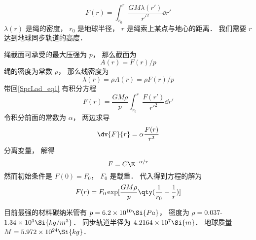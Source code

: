 
\begin{equation}\label{SpcLad_eq1}
F(r) = \int_{r_0}^{r} \frac{GM\lambda(r')}{r'^2} \dd{r'}
\end{equation}
$\lambda(r)$ 是绳的密度， $r_0$ 是地球半径， $r$ 是绳索上某点与地心的距离． 我们需要 $r$ 达到地球同步轨道的高度．

绳截面可承受的最大压强为 $p$， 那么截面为
\begin{equation}
A(r) = F(r)/p
\end{equation}
绳的密度为常数 $\rho$， 那么线密度为
\begin{equation}
\lambda(r) = \rho A(r) = \rho F(r)/p
\end{equation}
带回\autoref{SpcLad_eq1} 有积分方程
\begin{equation}
F(r) = \frac{GM\rho}{p} \int_{r_0}^{r} \frac{F(r')}{r'^2} \dd{r'}
\end{equation}
令积分前面的常数为 $\alpha$， 两边求导
\begin{equation}
\dv{F}{r} = \alpha \frac{F(r)}{r^2}
\end{equation}
分离变量， 解得
\begin{equation}
F = C\E^{-\alpha/r}
\end{equation}
然而初始条件是 $F(0) = F_0$， $F_0$ 是载重． 代入得到方程的解为
\begin{equation}
F(r) = F_0 \exp[\frac{GM\rho}{p} \qty(\frac{1}{r_0} - \frac{1}{r})]
\end{equation}

目前最强的材料碳纳米管有 $p = 6.2\times 10^{10} \Si{Pa}$， 密度为 $\rho = 0.037$-$1.34\times 10^{3} \Si{kg/m^3}$． 同步轨道半径为 $4.2164\times 10^7 \Si{m}$． 地球质量 $M = 5.972 \times 10^{24} \Si{kg}$．
